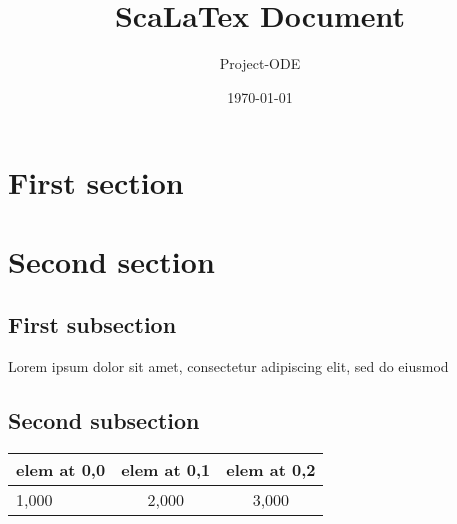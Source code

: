 \documentclass{report}
\title{ScaLaTex Document}
\date{\today}
\author{Project-ODE}
\begin{document}
\maketitle

\section{First section}

\section{Second section}

\subsection{First subsection}

Lorem ipsum dolor sit amet, consectetur adipiscing elit, sed do eiusmod

\subsection{Second subsection}

\begin{tabular}{|l|cc}

elem at 0,0 & elem at 0,1 & elem at 0,2\\
\hline
1,000 & 2,000 & 3,000\\

\end{tabular}
\end{document}
